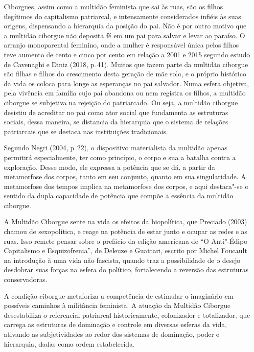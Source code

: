 Ciborgues, assim como a multidão feminista que sai às ruas, são os
filhos ilegítimos do capitalismo patriarcal, e intensamente considerados
infiéis às suas origens, dispensando a hierarquia da posição do pai. Não
é por outro motivo que a multidão ciborgue não deposita fé em um pai
para salvar e levar ao paraíso. O arranjo monoparental feminino, onde a
mulher é responsável única pelos filhos teve aumento de cento e cinco
por cento em relação a 2001 e 2015 segundo estudo de Cavenaghi e Diniz
(2018, p.\,41). Muitos que fazem parte da multidão ciborgue são filhas e
filhos do crescimento desta geração de mãe solo, e o próprio histórico
da vida os coloca para longe as esperanças no pai salvador. Numa esfera
objetiva, pela vivência em família cujo pai abandona ou nem registra os
filhos, a multidão ciborgue se subjetiva na rejeição do patriarcado. Ou
seja, a multidão ciborgue desistiu de acreditar no pai como ator social
que fundamenta as estruturas sociais, dessa maneira, se distancia da
hierarquia que o sistema de relações patriarcais que se destaca nas
instituições tradicionais.

Segundo Negri (2004, p.\,22), o dispositivo materialista da multidão
apenas permitirá especialmente, ter como princípio, o corpo e sua a
batalha contra a exploração. Desse modo, ele expressa a potência que se
dá, a partir da metamorfose dos corpos, tanto em seu conjunto, quanto em
sua singularidade. A metamorfose dos tempos implica na metamorfose dos
corpos, e aqui destaca"-se o sentido da dupla capacidade de potência que
compõe a essência da multidão ciborgue.

A Multidão Ciborgue sente na vida os efeitos da biopolítica, que
Preciado (2003) chamou de sexopolítica, e reage na potência de estar
junto e ocupar as redes e as ruas. Isso remete pensar sobre o prefácio
da edição americana de ``O Anti"-Édipo Capitalismo e Esquizofrenia'', de
Deleuze e Guattari, escrito por Michel Foucault na introdução à uma vida
não fascista, quando traz a possibilidade de o desejo desdobrar suas
forças na esfera do político, fortalecendo a reversão das estruturas
conservadoras.

A condição ciborgue metaforiza a competência de estimular o imaginário
em possíveis caminhos à militância feminista. A atuação da Multidão
Ciborgue desestabiliza o referencial patriarcal historicamente,
colonizador e totalizador, que carrega as estruturas de dominação e
controle em diversas esferas da vida, ativando as subjetividades ao
redor dos sistemas de dominação, poder e hierarquia, dadas como ordem
estabelecida.

